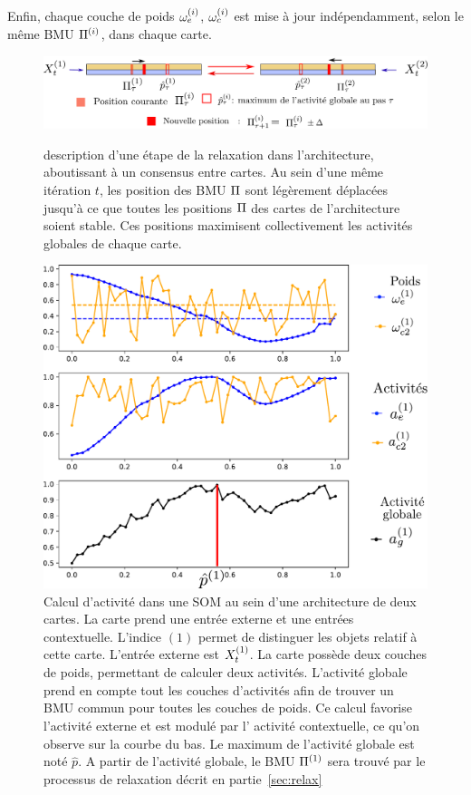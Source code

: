 Enfin, chaque couche de poids $\omega_{e}^{({i})}$, $\omega_c^{({i})}$ est mise à jour indépendamment, selon le même BMU $\Pi^{({i})}$, dans chaque carte. 
\begin{figure}
\centering
\includegraphics[width=\textwidth]{relaxation_2maps.pdf}
\label{fig:relax}
\caption{description d'une étape de la relaxation dans l'architecture, aboutissant à un consensus entre cartes. Au sein d'une même itération $t$, les position des BMU $\Pi$ sont légèrement déplacées jusqu'à ce que toutes les positions $\Pi$ des cartes de l'architecture soient stable. Ces positions maximisent collectivement les activités globales de chaque carte. }
\end{figure}

\begin{figure}
\begin{minipage}{0.6\textwidth}
\centering
\includegraphics[width=\textwidth]{activite_layers_2maps.pdf}
\end{minipage}
\hfill
\begin{minipage}{0.35\textwidth}
\caption{Calcul d'activité dans une SOM au sein d'une architecture de deux cartes. La carte prend une entrée externe et une entrées contextuelle. L'indice $(1)$ permet de distinguer les objets relatif à cette carte. L'entrée externe est $X^{({1})}_t$. La carte possède deux couches de poids, permettant de calculer deux activités. L'activité globale prend en compte tout les couches d'activités afin de trouver un BMU commun pour toutes les couches de poids. Ce calcul favorise l'activité externe et est modulé par l' activité contextuelle, ce qu'on observe sur la courbe du bas. Le maximum de l'activité globale est noté $\hat{p}$. A partir de l'activité globale, le BMU $\Pi^{({1})}$ sera trouvé par le processus de relaxation décrit en partie~\ref{sec:relax}}
\end{minipage}
\label{fig:2som_activite}
\end{figure}

